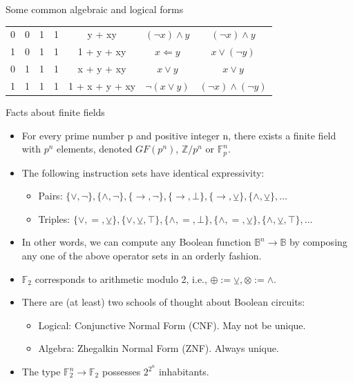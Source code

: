 \documentclass{beamer}
\begin{document}
\begin{frame}{Some common algebraic and logical forms}
\begin{tabular}{c|c|c|c|c|c|c}
    0   & 0   & 1   & 1   & y + xy         & $(\neg x) \land y          $         & $(\neg x) \land y                     $                      \\
    1   & 0   & 1   & 1   & 1 + y + xy     & $x \Longleftarrow y        $       & $x \vee (\neg y)                      $                       \\
    0   & 1   & 1   & 1   & x + y + xy     & $x \vee y                  $                 & $x \vee y                             $                              \\
    1   & 1   & 1   & 1   & 1 + x + y + xy & $\neg(x \vee y)            $           & $(\neg x) \land (\neg y)              $               \\
  \end{tabular}
  \endgroup
\end{frame}

\begin{frame}{Facts about finite fields}
  \begin{itemize}
    \item For every prime number p and positive integer n, there exists a finite field with $p^n$ elements, denoted $GF(p^n)$, $\mathbb{Z}/p^n$ or $\mathbb{F}_p^n$.
    \item The following instruction sets have identical expressivity:
    \begin{itemize}
      \item Pairs: $\{\vee, \neg\}, \{\wedge, \neg\}, \{\to, \neg\}, \{\to, \bot\}, \{\to, \veebar\}, \{\land, \veebar\}, \ldots$
      \item Triples: $\{\lor, =, \veebar\}, \{\lor, \veebar, \top\}, \{\land, =, \bot\}, \{\land, =, \veebar\}, \{\land, \veebar, \top\}, \ldots$
    \end{itemize}
    \item In other words, we can compute any Boolean function $\mathbb{B}^n\rightarrow\mathbb{B}$ by composing any one of the above operator sets in an orderly fashion.
    \item $\mathbb{F}_2$ corresponds to arithmetic modulo 2, i.e., $\oplus := \veebar, \otimes := \land$.
    \item There are (at least) two schools of thought about Boolean circuits:
    \begin{itemize}
      \item Logical: Conjunctive Normal Form (CNF). May not be unique.
      \item Algebra: Zhegalkin Normal Form (ZNF). Always unique.
    \end{itemize}
    \item The type $\mathbb{F}_2^n\rightarrow\mathbb{F}_2$ possesses $2^{2^{n}}$ inhabitants.
  \end{itemize}
\end{frame}
\end{document}
